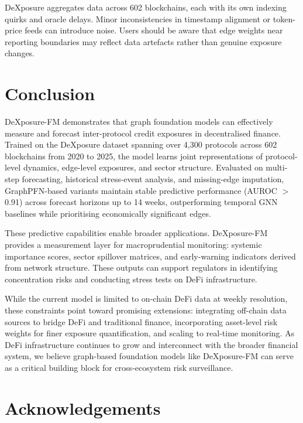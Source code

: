 \documentclass[preprint,12pt]{elsarticle}
\renewcommand{\paragraph}[1]{}
\begin{document}
\paragraph{Cross-chain data consistency.}
DeXposure aggregates data across 602 blockchains, each with its own indexing quirks and oracle delays. Minor inconsistencies in timestamp alignment or token-price feeds can introduce noise. Users should be aware that edge weights near reporting boundaries may reflect data artefacts rather than genuine exposure changes.
 \section{Conclusion}
\label{sec:conclusion}

DeXposure-FM demonstrates that graph foundation models can effectively measure and forecast inter-protocol credit exposures in decentralised finance. Trained on the DeXposure dataset spanning over 4,300 protocols across 602 blockchains from 2020 to 2025, the model learns joint representations of protocol-level dynamics, edge-level exposures, and sector structure. Evaluated on multi-step forecasting, historical stress-event analysis, and missing-edge imputation, GraphPFN-based variants maintain stable predictive performance (AUROC $>$0.91) across forecast horizons up to 14 weeks, outperforming temporal GNN baselines while prioritising economically significant edges.

These predictive capabilities enable broader applications. DeXposure-FM provides a measurement layer for macroprudential monitoring: systemic importance scores, sector spillover matrices, and early-warning indicators derived from network structure. These outputs can support regulators in identifying concentration risks and conducting stress tests on DeFi infrastructure.

While the current model is limited to on-chain DeFi data at weekly resolution, these constraints point toward promising extensions: integrating off-chain data sources to bridge DeFi and traditional finance, incorporating asset-level risk weights for finer exposure quantification, and scaling to real-time monitoring. As DeFi infrastructure continues to grow and interconnect with the broader financial system, we believe graph-based foundation models like DeXposure-FM can serve as a critical building block for cross-ecosystem risk surveillance.

\section*{Acknowledgements}








 

\end{document}
